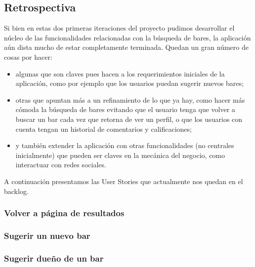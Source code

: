\subsection{Retrospectiva}
\par Si bien en estas dos primeras iteraciones del proyecto pudimos desarrollar el núcleo de las funcionalidades relacionadas con la búsqueda de bares, la aplicación aún dista mucho de estar completamente terminada. Quedan un gran número de cosas por hacer:
\begin{itemize}
 \item algunas que son claves pues hacen a los requerimientos iniciales de la aplicación, como por ejemplo que los usuarios puedan sugerir nuevos bares; 
 \item otras que apuntan más a un refinamiento de lo que ya hay, como hacer más cómoda la búsqueda de bares evitando que el usuario tenga que volver a buscar un bar cada vez que retorna de ver un perfil, o que los usuarios con cuenta tengan un historial de comentarios y calificaciones;
 \item y también extender la aplicación con otras funcionalidades (no centrales inicialmente) que pueden ser claves en la mecánica del negocio, como interactuar con redes sociales.
\end{itemize}

\par A continuación presentamos las User Stories que actualmente nos quedan en el backlog.

\subsubsection*{Volver a página de resultados}

\subsubsection*{Sugerir un nuevo bar}

\subsubsection*{Sugerir dueño de un bar}

